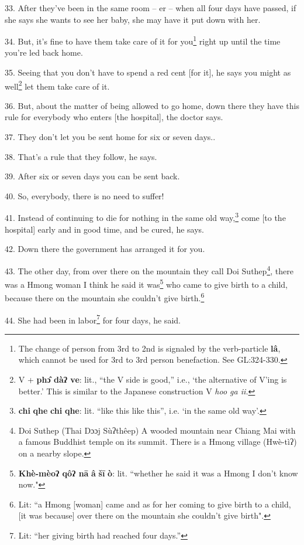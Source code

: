 33. After they've been in the same room -- er -- when all four days have passed,
if she says she wants to see her baby, she may have it put down with her.

34. But, it's fine to have them take care of it for you\footnote{The change of person from 3rd to 2nd is signaled by the verb-particle \textbf{lâ}, which cannot be used for 3rd to 3rd person benefaction. See GL:324-330.} right up until the
time you're led back home.

35. Seeing that you don't have to spend a red cent [for it], he says you might
as well\footnote{V + \textbf{phɔ̂ dàʔ ve}: lit., ``the V side is good,'' i.e., `the alternative of V'ing is better.' This is similar to the Japanese construction V \textit{hoo ga ii.}} let them take care of it.

36. But, about the matter of being allowed to go home, down there they have this
rule for everybody who enters [the hospital], the doctor says.

37. They don't let you be sent home for six or seven days..

38. That's a rule that they follow, he says.

39. After six or seven days you can be sent back.

40. So, everybody, there is no need to suffer!

41. Instead of continuing to die for nothing in the same old way,\footnote{\textbf{chi} \textbf{qhe} \textbf{chi} \textbf{qhe}: lit. ``like this like this'', i.e. `in the same old way'.} come [to
the hospital] early and in good time, and be cured, he says.

42. Down there the government has arranged it for you.

43. The other day, from over there on the mountain they call Doi Suthep\footnote{Doi Suthep (Thai Dɔɔj Sùʔthêep) A wooded mountain near Chiang Mai with a famous Buddhist temple on its summit. There is a Hmong village (Hwè-tìʔ) on a nearby slope.}, there
was a Hmong woman I think he said it was\footnote{\textbf{Khè-mèoʔ qôʔ nā} \textbf{â} \textbf{šī} \textbf{ò}: lit. ``whether he said it was a Hmong I don't know now."} who came to give birth to a child,
because there on the mountain she couldn't give birth.\footnote{Lit: ``a Hmong [woman] came and as for her coming to give birth to a child, [it was because] over there on the mountain she couldn't give birth".}

44. She had been in labor\footnote{Lit: ``her giving birth had reached four days.''} for four days, he said.

